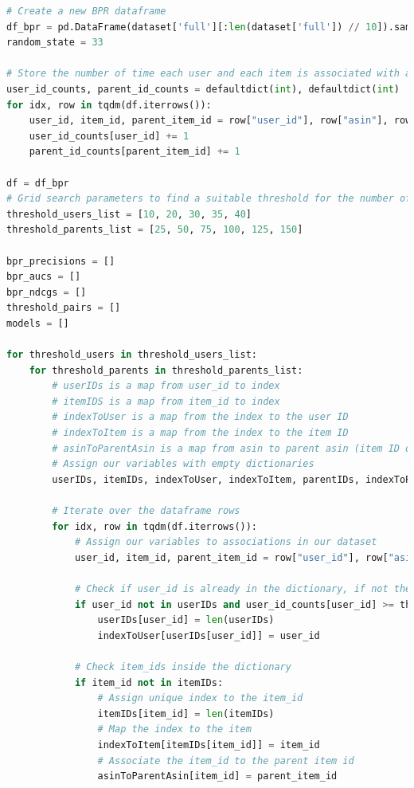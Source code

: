 \documentclass{article}
\begin{document}
\begin{lstlisting}[language=Python ]
# Create a new BPR dataframe
df_bpr = pd.DataFrame(dataset['full'][:len(dataset['full']) // 10]).sample(frac=.5, random_state=random_state)
random_state = 33

# Store the number of time each user and each item is associated with a review
user_id_counts, parent_id_counts = defaultdict(int), defaultdict(int)
for idx, row in tqdm(df.iterrows()):
    user_id, item_id, parent_item_id = row["user_id"], row["asin"], row["parent_asin"]
    user_id_counts[user_id] += 1
    parent_id_counts[parent_item_id] += 1

df = df_bpr
# Grid search parameters to find a suitable threshold for the number of times a user and an item are associated with a review. This helps deal with extremely sparse data and provides more interpretable recommendations.
threshold_users_list = [10, 20, 30, 35, 40]
threshold_parents_list = [25, 50, 75, 100, 125, 150]

bpr_precisions = []
bpr_aucs = []
bpr_ndcgs = []
threshold_pairs = []
models = []

for threshold_users in threshold_users_list:
    for threshold_parents in threshold_parents_list:
        # userIDs is a map from user_id to index
        # itemIDS is a map from item_id to index
        # indexToUser is a map from the index to the user ID
        # indexToItem is a map from the index to the item ID
        # asinToParentAsin is a map from asin to parent asin (item ID of all variants)
        # Assign our variables with empty dictionaries
        userIDs, itemIDs, indexToUser, indexToItem, parentIDs, indexToParent, asinToParentAsin = {}, {}, {}, {}, {}, {}, {}

        # Iterate over the dataframe rows
        for idx, row in tqdm(df.iterrows()):
            # Assign our variables to associations in our dataset
            user_id, item_id, parent_item_id = row["user_id"], row["asin"], row["parent_asin"]

            # Check if user_id is already in the dictionary, if not then assign it with a unique index
            if user_id not in userIDs and user_id_counts[user_id] >= threshold_users:
                userIDs[user_id] = len(userIDs)
                indexToUser[userIDs[user_id]] = user_id

            # Check item_ids inside the dictionary
            if item_id not in itemIDs:
                # Assign unique index to the item_id
                itemIDs[item_id] = len(itemIDs)
                # Map the index to the item
                indexToItem[itemIDs[item_id]] = item_id
                # Associate the item_id to the parent item id
                asinToParentAsin[item_id] = parent_item_id


\end{lstlisting}
\end{document}

